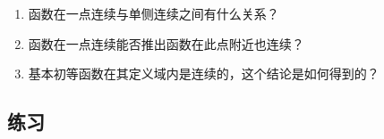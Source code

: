 \documentclass[a4paper,punct=CCT]{ctexbook}
\theoremstyle{definition}
\theoremstyle{remark}
\newif\ifshowex
\newif\ifshowsolp
\begin{document}
\begin{enumerate}
\item 函数在一点连续与单侧连续之间有什么关系？

  \ifshowsolp
  参见定理~\ref{thm:contsided}．
  \fi

\item 函数在一点连续能否推出函数在此点附近也连续？

  \ifshowsolp
  不能．
  \fi

\item 基本初等函数在其定义域内是连续的，这个结论是如何得到的？

  \ifshowsolp
  其实这要把基本初等函数分成两类来看：一类是超越函数（transcedental functions）、另一类是代数函数（algebraic functions）．代数函数基本上可以由实数公理推出来．超越函数中的指数函数可以定义成
  \begin{equation*}
    \exp x \coloneq \lim_{n\to\infty} \paren*{1 + \frac xn}^n,
  \end{equation*}
  然后通过讨论这个数列的单调性和有界性论证它总是收敛的，并且研究出它的很多性质满足我们中学学过的指数运算法则．由这些结论，我们可以证明指数函数是连续的．再由此定义对数函数为指数函数的反函数，得到它的一系列性质．这样，对于超越的幂函数，例如\(x^π\)，就可以变形成\(\expb{π \ln x}\)，再由定理~\ref{thm:contcomp}和定理~\ref{thm:cont4ops}得出其连续性．

  对于超越函数中的三角函数，正弦函数的连续性已经由定理~\ref{thm:contsin}给出，余弦函数的连续性可由\(\cos x = \sinp{π/2-x}\)再加上定理~\ref{thm:contcomp}得出．剩下的三角函数，对正弦函数和余弦函数使用定理~\ref{thm:cont4ops}即可得到它们的连续性．
  \fi
\end{enumerate}

\ifshowex
{}
\subsection*{练习}
\end{document}

